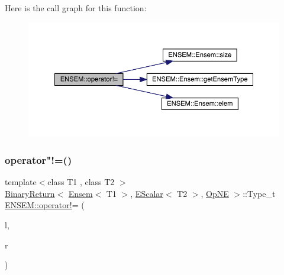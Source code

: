 Here is the call graph for this function\+:\nopagebreak
\begin{figure}[H]
\begin{center}
\leavevmode
\includegraphics[width=350pt]{d1/d9e/group__eensem_ga9f462a3d207e1a214ab95765f6fb90d3_cgraph}
\end{center}
\end{figure}
\mbox{\label{group__eensem_ga8086f697f52b0363688785b35a8cdca3}} 
\subsubsection{\texorpdfstring{operator"!=()}{operator!=()}\hspace{0.1cm}{\footnotesize\ttfamily [2/3]}}
{\footnotesize\ttfamily template$<$class T1 , class T2 $>$ \\
\mbox{\hyperlink{structENSEM_1_1BinaryReturn}{Binary\+Return}}$<$ \mbox{\hyperlink{classENSEM_1_1Ensem}{Ensem}}$<$ T1 $>$, \mbox{\hyperlink{classENSEM_1_1EScalar}{E\+Scalar}}$<$ T2 $>$, \mbox{\hyperlink{structENSEM_1_1OpNE}{Op\+NE}} $>$\+::Type\+\_\+t \mbox{\hyperlink{group__escalar_ga248e30ef2d97325ac4b11c077bc514dd}{E\+N\+S\+E\+M\+::operator!}}= (\begin{DoxyParamCaption}\item[{const \mbox{\hyperlink{classENSEM_1_1Ensem}{Ensem}}$<$ T1 $>$ \&}]{l,  }\item[{const \mbox{\hyperlink{classENSEM_1_1EScalar}{E\+Scalar}}$<$ T2 $>$ \&}]{r }\end{DoxyParamCaption})\hspace{0.3cm}{\ttfamily [inline]}}

